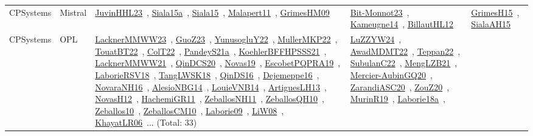 {\begin{longtable}{lp{3cm}>{\raggedright\arraybackslash}p{6cm}>{\raggedright\arraybackslash}p{6cm}>{\raggedright\arraybackslash}p{8cm}}
CPSystems & Mistral & \href{../works/JuvinHHL23.pdf}{JuvinHHL23}~\cite{JuvinHHL23}, \href{../works/Siala15a.pdf}{Siala15a}~\cite{Siala15a}, \href{../works/Siala15.pdf}{Siala15}~\cite{Siala15}, \href{../works/Malapert11.pdf}{Malapert11}~\cite{Malapert11}, \href{../works/GrimesHM09.pdf}{GrimesHM09}~\cite{GrimesHM09} & \href{../works/Bit-Monnot23.pdf}{Bit-Monnot23}~\cite{Bit-Monnot23}, \href{../works/Kameugne14.pdf}{Kameugne14}~\cite{Kameugne14}, \href{../works/BillautHL12.pdf}{BillautHL12}~\cite{BillautHL12} & \href{../works/GrimesH15.pdf}{GrimesH15}~\cite{GrimesH15}, \href{../works/SialaAH15.pdf}{SialaAH15}~\cite{SialaAH15}\\
CPSystems & OPL & \href{../works/LacknerMMWW23.pdf}{LacknerMMWW23}~\cite{LacknerMMWW23}, \href{../works/GuoZ23.pdf}{GuoZ23}~\cite{GuoZ23}, \href{../works/YunusogluY22.pdf}{YunusogluY22}~\cite{YunusogluY22}, \href{../works/MullerMKP22.pdf}{MullerMKP22}~\cite{MullerMKP22}, \href{../works/TouatBT22.pdf}{TouatBT22}~\cite{TouatBT22}, \href{../works/ColT22.pdf}{ColT22}~\cite{ColT22}, \href{../works/PandeyS21a.pdf}{PandeyS21a}~\cite{PandeyS21a}, \href{../works/KoehlerBFFHPSSS21.pdf}{KoehlerBFFHPSSS21}~\cite{KoehlerBFFHPSSS21}, \href{../works/LacknerMMWW21.pdf}{LacknerMMWW21}~\cite{LacknerMMWW21}, \href{../works/QinDCS20.pdf}{QinDCS20}~\cite{QinDCS20}, \href{../works/Novas19.pdf}{Novas19}~\cite{Novas19}, \href{../works/EscobetPQPRA19.pdf}{EscobetPQPRA19}~\cite{EscobetPQPRA19}, \href{../works/LaborieRSV18.pdf}{LaborieRSV18}~\cite{LaborieRSV18}, \href{../works/TangLWSK18.pdf}{TangLWSK18}~\cite{TangLWSK18}, \href{../works/QinDS16.pdf}{QinDS16}~\cite{QinDS16}, \href{../works/Dejemeppe16.pdf}{Dejemeppe16}~\cite{Dejemeppe16}, \href{../works/NovaraNH16.pdf}{NovaraNH16}~\cite{NovaraNH16}, \href{../works/AlesioNBG14.pdf}{AlesioNBG14}~\cite{AlesioNBG14}, \href{../works/LouieVNB14.pdf}{LouieVNB14}~\cite{LouieVNB14}, \href{../works/ArtiguesLH13.pdf}{ArtiguesLH13}~\cite{ArtiguesLH13}, \href{../works/NovasH12.pdf}{NovasH12}~\cite{NovasH12}, \href{../works/HachemiGR11.pdf}{HachemiGR11}~\cite{HachemiGR11}, \href{../works/ZeballosNH11.pdf}{ZeballosNH11}~\cite{ZeballosNH11}, \href{../works/ZeballosQH10.pdf}{ZeballosQH10}~\cite{ZeballosQH10}, \href{../works/Zeballos10.pdf}{Zeballos10}~\cite{Zeballos10}, \href{../works/ZeballosCM10.pdf}{ZeballosCM10}~\cite{ZeballosCM10}, \href{../works/Laborie09.pdf}{Laborie09}~\cite{Laborie09}, \href{../works/LiW08.pdf}{LiW08}~\cite{LiW08}, \href{../works/KhayatLR06.pdf}{KhayatLR06}~\cite{KhayatLR06}... (Total: 33) & \href{../works/LuZZYW24.pdf}{LuZZYW24}~\cite{LuZZYW24}, \href{../works/AwadMDMT22.pdf}{AwadMDMT22}~\cite{AwadMDMT22}, \href{../works/Teppan22.pdf}{Teppan22}~\cite{Teppan22}, \href{../works/SubulanC22.pdf}{SubulanC22}~\cite{SubulanC22}, \href{../works/MengLZB21.pdf}{MengLZB21}~\cite{MengLZB21}, \href{../works/Mercier-AubinGQ20.pdf}{Mercier-AubinGQ20}~\cite{Mercier-AubinGQ20}, \href{../works/ZarandiASC20.pdf}{ZarandiASC20}~\cite{ZarandiASC20}, \href{../works/ZouZ20.pdf}{ZouZ20}~\cite{ZouZ20}, \href{../works/MurinR19.pdf}{MurinR19}~\cite{MurinR19}, \href{../works/Laborie18a.pdf}{Laborie18a}~\cite{Laborie18a}, 
\end{longtable}}
